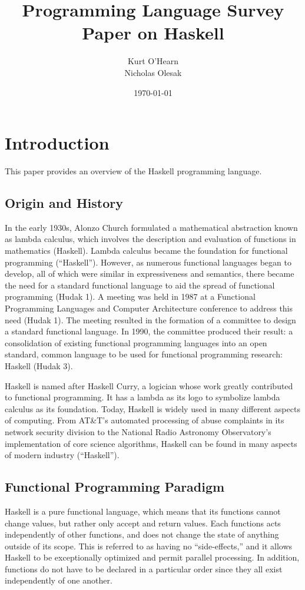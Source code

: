 \documentclass[titlepage,12pt]{article}
\title{Programming Language Survey Paper on Haskell}
\author{
        Kurt O'Hearn\\
        Nicholas Olesak\\
}
\date{\today}
\begin{document}
\maketitle 
\setcounter{tocdepth}{3}
\tableofcontents \newpage

\section{Introduction}
This paper provides an overview of the Haskell programming language.

\subsection{Origin and History}

In the early 1930s, Alonzo Church formulated a mathematical abstraction known as lambda calculus, which involves the description and evaluation of functions in mathematics (Haskell). Lambda calculus became the foundation for functional programming (``Haskell''). However, as numerous functional languages began to develop, all of which were similar in expressiveness and semantics, there became the need for a standard functional language to aid the spread of functional programming (Hudak 1). A meeting was held in 1987 at a Functional Programming Languages and Computer Architecture conference to address this need (Hudak 1). The meeting resulted in the formation of a committee to design a standard functional language. In 1990, the committee produced their result: a consolidation of existing functional programming languages into an open standard, common language to be used for functional programming research: Haskell (Hudak 3).

Haskell is named after Haskell Curry, a logician whose work greatly contributed to functional programming. It has a lambda as its logo to symbolize lambda calculus as its foundation. Today, Haskell is widely used in many different aspects of computing. From AT\&T's automated processing of abuse complaints in its network security division to the National Radio Astronomy Observatory’s implementation of core science algorithms, Haskell can be found in many aspects of modern industry (``Haskell''). 

\subsection{Functional Programming Paradigm}

Haskell is a pure functional language, which means that its functions cannot change values, but rather only accept and return values. Each functions acts independently of other functions, and does not change the state of anything outside of its scope. This is referred to as having no ``side-effects,'' and it allows Haskell to be exceptionally optimized and permit parallel processing. In addition, functions do not have to be declared in a particular order since they all exist independently of one another. 
\end{document}
